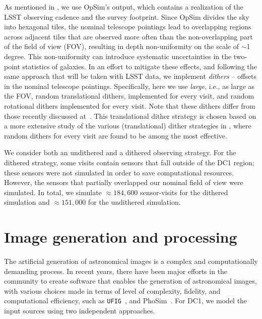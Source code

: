 \documentclass[\docopts]{\docclass}
\begin{document}
As mentioned in , we use OpSim's output, which contains a realization of the LSST observing cadence and the survey footprint. Since OpSim divides the sky into hexagonal tiles, the nominal telescope pointings lead to overlapping regions across adjacent tiles that are observed more often than the non-overlapping part of the field of view (FOV), resulting in depth non-uniformity on the scale of $\sim$1 degree. This non-uniformity can introduce systematic uncertainties in the two-point statistics of galaxies\citep{2016ApJ...829...50A}. In an effort to mitigate these effects, and following the same approach that will be taken with LSST data, we implement \textit{dithers} -- offsets in the nominal telescope pointings. Specifically, here we use \textit{large}, i.e., as large as the FOV, random translational dithers, implemented for every visit, and random rotational dithers implemented for every visit. Note that these dithers differ from those recently discussed at~\citet{2018arXiv181200515L}. This translational dither strategy is chosen based on a more extensive study of the various (translational) dither strategies in \citet{2016ApJ...829...50A}, where random dithers for every visit are found to be among the most effective.

We consider both an undithered and a dithered observing strategy. For the dithered strategy, some visits contain sensors that fall outside of the DC1 region; these sensors were not simulated in order to save computational resources. However, the sensors that partially overlapped our nominal field of view were simulated. In total, we simulate $\approx 184,600$ sensor-visits for the dithered simulation and $\approx 151,000$ for the undithered simulation.




\section{Image generation and processing}
\label{sec:image_generation_pipeline}

The artificial generation of astronomical images is a complex and computationally demanding process. In recent
years, there have been major efforts in the community to create software that enables the generation of astronomical images, with various choices made in terms of level of complexity, fidelity, and computational efficiency, such as \texttt{UFIG}~\citep{2016ApJ...817...25B}, and PhoSim~\citep{2015ApJS..218...14P}. For DC1, we model the input sources using
two independent approaches. 
\end{document}
